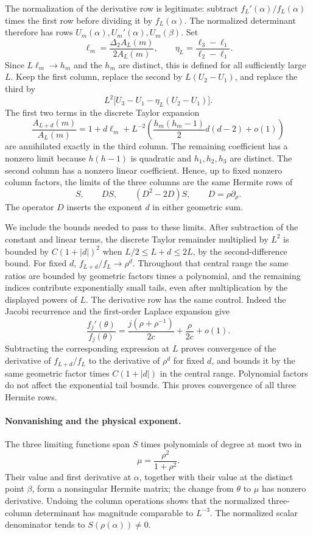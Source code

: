 The normalization of the derivative row is legitimate: subtract
$f_L'(\alpha)/f_L(\alpha)$ times the first row before dividing it by
$f_L(\alpha)$. The normalized determinant therefore has rows
$U_m(\alpha),U_m'(\alpha),U_m(\beta)$. Set
\[
 \ell_m=\frac{\Delta_2 A_L(m)}{2A_L(m)},\qquad
 \eta_L=\frac{\ell_3-\ell_1}{\ell_2-\ell_1}.
\]
Since $L\ell_m\to h_m$ and the $h_m$ are distinct, this is defined
for all sufficiently large $L$. Keep the first column, replace the
second by $L(U_2-U_1)$, and replace the third by
\[
 L^2\big[U_3-U_1-\eta_L(U_2-U_1)\big].
\]
The first two terms in the discrete Taylor expansion
\[
 \frac{A_{L+d}(m)}{A_L(m)}
 =1+d\ell_m+
  L^{-2}\left(\frac{h_m(h_m-1)}2d(d-2)+o(1)\right)
\]
are annihilated exactly in the third column. The remaining coefficient
has a nonzero limit because $h(h-1)$ is quadratic and
$h_1,h_2,h_3$ are distinct. The second column has a nonzero linear
coefficient. Hence, up to fixed nonzero column factors, the limits of
the three columns are the same Hermite rows of
\[
 S,\qquad DS,\qquad(D^2-2D)S,\qquad D=\rho\partial_\rho.
\]
The operator $D$ inserts the exponent $d$ in either geometric sum.

We include the bounds needed to pass to these limits. After subtraction
of the constant and linear terms, the discrete Taylor remainder
multiplied by $L^2$ is bounded by $C(1+|d|)^2$ when
$L/2\le L+d\le2L$, by the second-difference bound. For fixed $d$,
$f_{L+d}/f_L\to\rho^d$. Throughout that central range the same
ratios are bounded by geometric factors times a polynomial, and the
remaining indices contribute exponentially small tails, even after
multiplication by the displayed powers of $L$.
The derivative row has the same control. Indeed the Jacobi recurrence
and the first-order Laplace expansion give
\[
 \frac{f_j'(\theta)}{f_j(\theta)}
 =\frac{j(\rho+\rho^{-1})}{2c}+\frac\rho{2c}+o(1).
\]
Subtracting the corresponding expression at $L$ proves convergence of
the derivative of $f_{L+d}/f_L$ to the derivative of $\rho^d$ for fixed
$d$, and bounds it by the same geometric factor times $C(1+|d|)$ in
the central range. Polynomial factors do not affect the exponential
tail bounds. This proves convergence of all three Hermite rows.

\paragraph{Nonvanishing and the physical exponent.}
The three limiting functions span $S$ times polynomials of degree at
most two in
\[
 \mu=\frac{\rho^2}{1+\rho^2}.
\]
Their value and first derivative at $\alpha$, together with their value
at the distinct point $\beta$, form a nonsingular Hermite matrix; the
change from $\theta$ to $\mu$ has nonzero derivative. Undoing the
column operations shows that the normalized three-column determinant
has magnitude comparable to $L^{-3}$. The normalized scalar denominator
tends to $S(\rho(\alpha))\ne0$.

